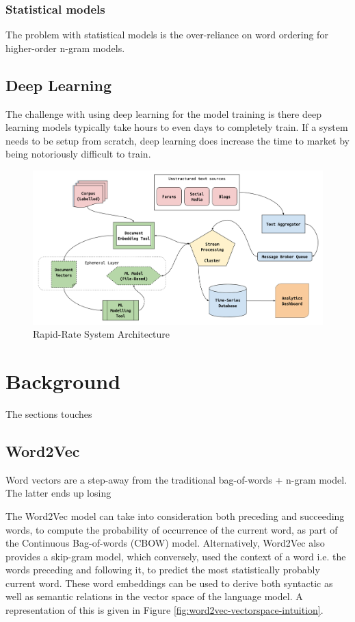 \documentclass[conference]{IEEEtran}
\begin{document}
        \subsubsection{Statistical models}
        The problem with statistical models is the over-reliance on word ordering for higher-order n-gram models.

    \subsection{Deep Learning}
        The challenge with using deep learning for the model training is there deep learning models typically take hours to even days to completely train. If a system needs to be setup from scratch, deep learning does increase the time to market by being notoriously difficult to train.

\vspace{5mm}

\begin{figure}[ht] \label{fig:system-architecture}
    \centering
    \includegraphics[width=\textwidth]{images/rapid_rate_system_arch_1.png}
    \caption{Rapid-Rate System Architecture}
\end{figure}

\section{Background}
    The sections touches 

    \subsection{Word2Vec} \label{Word2Vec}
        Word vectors are a step-away from the traditional bag-of-words + n-gram model. The latter ends up losing

        The Word2Vec model\cite{mikolov2013efficient} can take into consideration both preceding and succeeding words, to compute the probability of occurrence of the current word, as part of the Continuous Bag-of-words (CBOW) model. Alternatively, Word2Vec also provides a skip-gram model\cite{mikolov2013distributed}, which conversely, used the context of a word i.e. the words preceding and following it, to predict the most statistically probably current word. These word embeddings can be used to derive both syntactic as well as semantic relations in the vector space of the language model. A representation of this is given in Figure \ref{fig:word2vec-vectorspace-intuition}.
\end{document}
